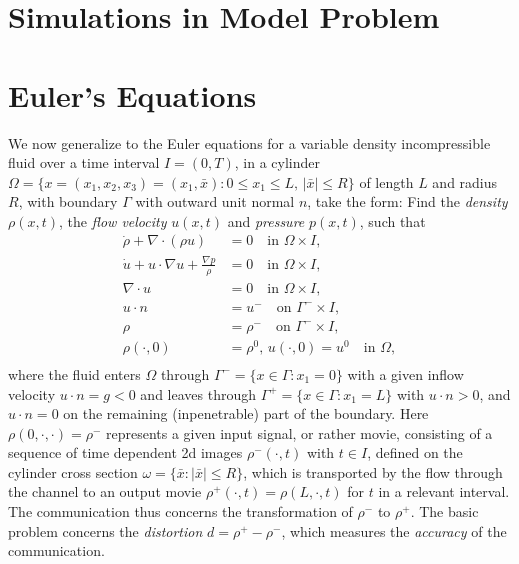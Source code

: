    
\section{Simulations in Model Problem}
 


 




\section{Euler's Equations}

We now generalize to the Euler equations for a variable density 
incompressible fluid
over a time interval $I=(0,T)$,
in a cylinder $\Omega =\{x=(x_1,x_2,x_3)=(x_1,\bar x): 0\le x_1\le L,\, \vert\bar x\vert\le R\}$
of length $L$ and radius $R$, with boundary $\Gamma$ with outward unit
normal $n$,  take the form: 
Find the \emph{density} $\rho (x,t)$, the 
\emph{flow velocity} $u(x,t)$ and \emph{pressure} $p(x,t)$, such that
\begin{equation}\label{euler}
\begin{split}
\dot\rho + \nabla\cdot (\rho u)&=0\quad \mbox{in } \Omega\times I,\\
\dot u+u\cdot\nabla u +\frac{\nabla p}{\rho}&=0\quad \mbox{in } \Omega\times I,\\
\nabla\cdot u&=0\quad \mbox{in } \Omega\times I,\\
u\cdot n&=u^-\quad \mbox{on } \Gamma^-\times I,\\ 
\rho &=\rho^-\quad \mbox{on } \Gamma^-\times I,\\ 
\rho (\cdot ,0)&=\rho^0, \, u(\cdot ,0)=u^0\quad \mbox{in } \Omega,\\ 
\end{split}
\end{equation}
where the fluid enters $\Omega$ through 
$\Gamma^- =\{x\in\Gamma :x_1=0\}$ with a given
inflow velocity $u\cdot n=g<0$ and
leaves through $\Gamma^+ =\{x\in\Gamma :x_1=L\}$ with
$u\cdot n>0$, and
$u\cdot n=0$ on the remaining (inpenetrable) part of the boundary.
Here $\rho (0,\cdot, \cdot )=\rho^-$ represents a given
input signal, or rather movie, consisting of 
a sequence of time dependent 2d images $\rho^-(\cdot ,t)$
with $t\in I$, defined on the cylinder cross section 
$\omega =\{\bar x:\vert\bar x\vert\le R\}$,  which is transported 
by the flow through the channel
to an output movie $\rho^+(\cdot ,t)=\rho (L,\cdot ,t)$ for $t$ in
a relevant interval.
The communication thus concerns the transformation of $\rho^-$ to
$\rho^+$. The basic problem concerns the \emph{distortion}
$d=\rho^+-\rho^-$, which measures the \emph{accuracy} of the
communication.



